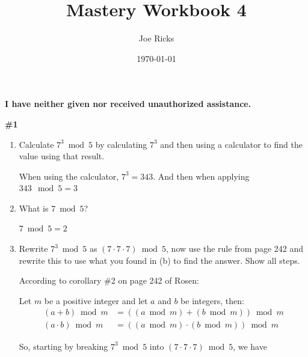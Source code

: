 \documentclass{article}
\title{Mastery Workbook 4}
\author{Joe Ricks}
\date{\today}
\newcommand{\sectionbreak}{\clearpage}
\begin{document}
\maketitle

\textbf{\Huge I have neither given nor received unauthorized assistance.}

\sectionbreak

\textbf{\#1}

\bigbreak

\begin{enumerate}[label=\alph*.]
    \item Calculate $7^3 \bmod 5$ by calculating $7^3$ and then using a calculator to find the value using that result.

    \bigbreak

    When using the calculator, $7^3 = 343$. And then when applying $343 \mod 5 = 3$

    \bigbreak

    \item What is $7 \bmod 5$?

    \bigbreak

    $7 \bmod 5 = 2$

    \bigbreak

    \item Rewrite $7^3 \bmod 5$ as $(7 \cdot 7 \cdot 7) \bmod 5$, now use the rule from page 242 and rewrite this to use what you found in (b) to find the answer. Show all steps.

    \bigbreak

    According to corollary \#2 on page 242 of Rosen:

    \medbreak

    Let $m$ be a positive integer and let $a$ and $b$ be integers, then:
    \begin{align*}
        (a + b) \bmod m &= ((a \bmod m) + (b \bmod m)) \bmod m \\[6pt]
        (a \cdot b) \bmod m &= ((a \bmod m) \cdot (b \bmod m)) \bmod m
    \end{align*}

    So, starting by breaking $7^3 \bmod 5$ into $(7\cdot 7\cdot 7) \bmod 5$, we have
    \bigbreak


\end{enumerate}
\end{document}
